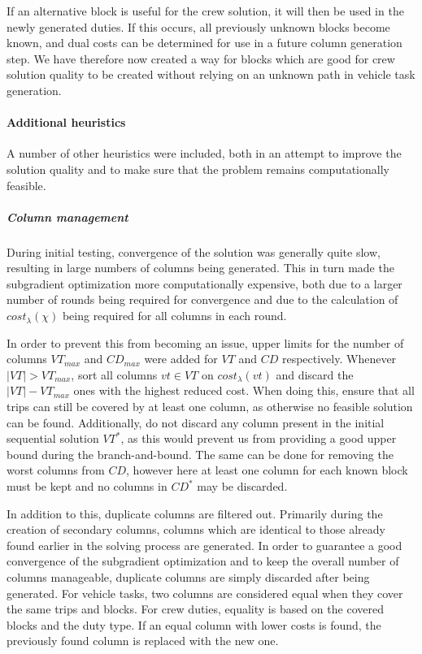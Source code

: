 \documentclass[]{article}
\begin{document}
If an alternative block is useful for the crew solution, it will then be used in the newly generated duties. If this occurs, all previously unknown blocks become known, and dual costs can be determined for use in a future column generation step. We have therefore now created a way for blocks which are good for crew solution quality to be created without relying on an unknown path in vehicle task generation.

\paragraph{Additional heuristics} \label{sec:evcsp-heuristics}
A number of other heuristics were included, both in an attempt to improve the solution quality and to make sure that the problem remains computationally feasible.

\subparagraph{Column management} During initial testing, convergence of the solution was generally quite slow, resulting in large numbers of columns being generated. This in turn made the subgradient optimization more computationally expensive, both due to a larger number of rounds being required for convergence and due to the calculation of $cost_\lambda(\chi)$ being required for all columns in each round. 

In order to prevent this from becoming an issue, upper limits for the number of columns $VT_{max}$ and $CD_{max}$ were added for $VT$ and $CD$ respectively. Whenever $|VT| > VT_{max}$, sort all columns $vt \in VT$ on $cost_\lambda(vt)$ and discard the $|VT| - VT_{max}$ ones with the highest reduced cost. When doing this, ensure that all trips can still be covered by at least one column, as otherwise no feasible solution can be found. Additionally, do not discard any column present in the initial sequential solution $VT^*$, as this would prevent us from providing a good upper bound during the branch-and-bound. The same can be done for removing the worst columns from $CD$, however here at least one column for each known block must be kept and no columns in $CD^*$ may be discarded.

In addition to this, duplicate columns are filtered out. Primarily during the creation of secondary columns, columns which are identical to those already found earlier in the solving process are generated. In order to guarantee a good convergence of the subgradient optimization and to keep the overall number of columns manageable, duplicate columns are simply discarded after being generated. For vehicle tasks, two columns are considered equal when they cover the same trips and blocks. For crew duties, equality is based on the covered blocks and the duty type. If an equal column with lower costs is found, the previously found column is replaced with the new one.
\end{document}
